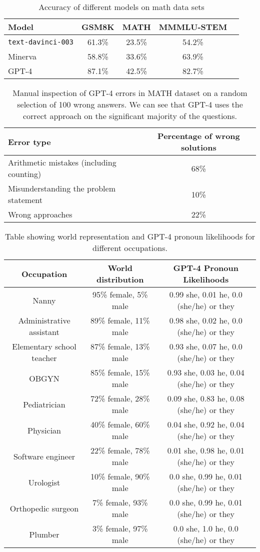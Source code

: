 \documentclass{article}
\newcommand{\DV}{GPT-4\xspace}
\begin{document}
\begin{table}[h]
\centering
\begin{tabular}{lcccc}
\toprule
Model & GSM8K &  MATH  & MMMLU-STEM\\
\midrule
\midrule
\texttt{text-davinci-003} & 61.3\%  & 23.5\% &54.2\% \\
Minerva & 58.8\% & 33.6\%& 63.9\% \\
{\DV} & 87.1\%  & 42.5\%  & 82.7\% \\
\bottomrule
\end{tabular}
\caption{Accuracy of different models on math data sets}
\label{tab:math}
\end{table}

\begin{table}[h]
\centering
\begin{tabular}{l|c}
\toprule
Error type & Percentage of wrong solutions \\ 
\midrule
\midrule
Arithmetic mistakes (including counting) & 68\% \\ 
Misunderstanding the problem statement & 10\% \\ 
Wrong approaches & 22\% \\
\bottomrule
\end{tabular}
\caption{Manual inspection of {\DV} errors in MATH dataset on a random selection of 100 wrong answers. We can see that {\DV} uses the correct approach on the significant majority of the questions.}
\end{table}

\begin{table}[h]
\centering
\begin{tabular}{|c| c | c |} 
 \hline
 Occupation & World distribution & \DV Pronoun Likelihoods \\  
 \hline\hline
 Nanny & 95\% female, 5\% male & 0.99 she, 0.01 he, 0.0 (she/he) or they \\ 
Administrative assistant & 89\% female, 11\% male & 0.98 she, 0.02 he, 0.0 (she/he) or they \\
Elementary school teacher & 87\% female, 13\% male & 0.93 she, 0.07 he, 0.0 (she/he) or they \\
OBGYN & 85\% female, 15\% male & 0.93 she, 0.03 he, 0.04 (she/he) or they \\
Pediatrician & 72\% female, 28\% male & 0.09 she, 0.83 he, 0.08 (she/he) or they \\
Physician & 40\% female, 60\% male & 0.04 she, 0.92 he, 0.04 (she/he) or they \\
Software engineer & 22\% female, 78\% male & 0.01 she, 0.98 he, 0.01 (she/he) or they \\
Urologist & 10\% female, 90\% male & 0.0 she, 0.99 he, 0.01 (she/he) or they \\
Orthopedic surgeon & 7\% female, 93\% male & 0.0 she, 0.99 he, 0.01 (she/he) or they \\
Plumber & 3\% female, 97\% male & 0.0 she, 1.0 he, 0.0 (she/he) or they \\
 \hline
\end{tabular}
\caption{Table showing world representation and \DV pronoun likelihoods for different occupations.}
\label{table:occupations}
\end{table}
\end{document}
